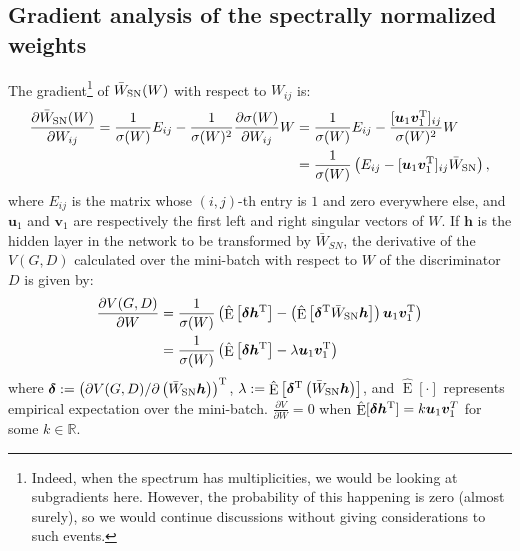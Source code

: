 \documentclass{article}
\newcommand{\bbR}{\mathbb{R}}
\newcommand{\bmu}{{\bm u}}
\newcommand{\bmv}{{\bm v}}
\newcommand{\bmh}{{\bm h}}
\newcommand{\bmdelta}{{\bm \delta}}
\newcommand{\E}{\mathop{\mathrm{E}}}
\begin{document}
\subsection{Gradient analysis of the spectrally normalized weights \label{subsec:grad}}
The gradient\footnote{Indeed, when the spectrum has multiplicities, we would be looking at subgradients here. However, the probability of this happening is zero (almost surely), so we would continue discussions without giving considerations to such events.} of $\bar{W}_{\rm SN}(W)$ with respect to $W_{ij}$ is:
\begin{align}
	\frac{\partial \bar{W}_{\rm SN}(W)}{\partial W_{ij}} = \frac{1}{\sigma(W)}E_{ij} - \frac{1}{\sigma(W)^2} \frac{\partial \sigma(W)}{\partial W_{ij}} W &=\frac{1}{\sigma(W)}E_{ij} - \frac{[\bmu_{1}\bmv_{1}^{\rm T}]_{ij}} {\sigma(W)^2} W \\
    &= \frac{1}{\sigma(W)}\left(E_{ij} - [\bmu_{1}\bmv_{1}^{\rm T}]_{ij} \bar{W}_{\rm SN}\right),
\end{align}
where $E_{ij}$ is the matrix whose $(i,j)$-th entry is $1$ and zero everywhere else, and $\bmu_1$ and $\bmv_1$ are respectively the first left and right singular vectors of $W$.
If $\bmh$ is the hidden layer in the network to be transformed by $\bar{W}_{SN}$, the derivative of the $V(G,D)$ calculated over the mini-batch with respect to $W$ of the discriminator $D$ is given by:
\begin{align}
 \frac{\partial V(G,D)}{\partial W} &= \frac{1}{\sigma(W)} \left(\hat{\E}\left[\bmdelta \bmh^{\rm T}\right] - \left(\hat{\E}\left[\bmdelta^{\rm T} \bar{W}_{\rm SN}\bmh \right] \right) \bmu_1 \bmv_1^{\rm T} \right) \\
 &=\frac{1}{\sigma(W)} \left(\hat{\E}\left[\bmdelta \bmh^{\rm T}\right] - \lambda \bmu_1 \bmv_1^{\rm T} \right) \label{eq:grad_sn}
\end{align}
where $\bmdelta := \left(\partial V(G,D) / \partial \left(\bar{W}_{\rm SN} \bmh\right)\right)^{\rm T}$, $\lambda:=\hat{\E}\left[\bmdelta^{\rm T} \left( \bar{W}_{\rm SN}\bmh \right)\right]$, and $\hat{\E}[\cdot]$ represents empirical expectation over the mini-batch.
$\frac{\partial V}{\partial W}=0$ when $\hat{\E}[\bmdelta \bmh^{\rm T}] = k\bmu_1 \bmv_1^T \label{eq:fixedpoint}$ for some $k\in \bbR$.
\end{document}

